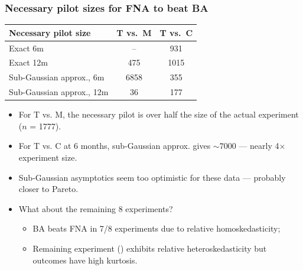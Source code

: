 \documentclass[aspectratio=169, 10pt]{beamer}
\theoremstyle{definition}
\theoremstyle{plain}
\begin{document}
\begin{frame}
\frametitle{Necessary pilot sizes for FNA to beat BA}
\centering\small
\begin{tabular}{lcc}
\toprule
Necessary pilot size       & T vs.\ M & T vs.\ C \\
\midrule
Exact 6m                   & --       & 931  \\
Exact 12m                  & 475      & 1015 \\
\midrule
Sub-Gaussian approx., 6m   & 6858     & 355  \\
Sub-Gaussian approx., 12m  & 36       & 177  \\
\bottomrule
\end{tabular}
\vfill
\begin{itemize}
  \item For T vs. M, the necessary pilot is over half the size of the actual
    experiment (\(n\) = 1777).
    \vfill
  \item For T vs. C at 6 months, sub-Gaussian approx. gives \(\sim 7000\) ---
    nearly 4\(\times\) experiment size.
    \vfill
  \item Sub-Gaussian asymptotics seem too optimistic for these data --- probably
    closer to Pareto.
    \vfill
  \item What about the remaining 8 experiments?
    \begin{itemize}
      \item BA beats FNA in 7/8 experiments due to relative homoskedasticity;
        \vfill
      \item Remaining experiment (\citet{2017mckenzieIdentifyingSpurringHigh})
        exhibits relative heteroskedasticity but outcomes have high kurtosis.
    \end{itemize}
\end{itemize}
\end{frame}
\end{document}
